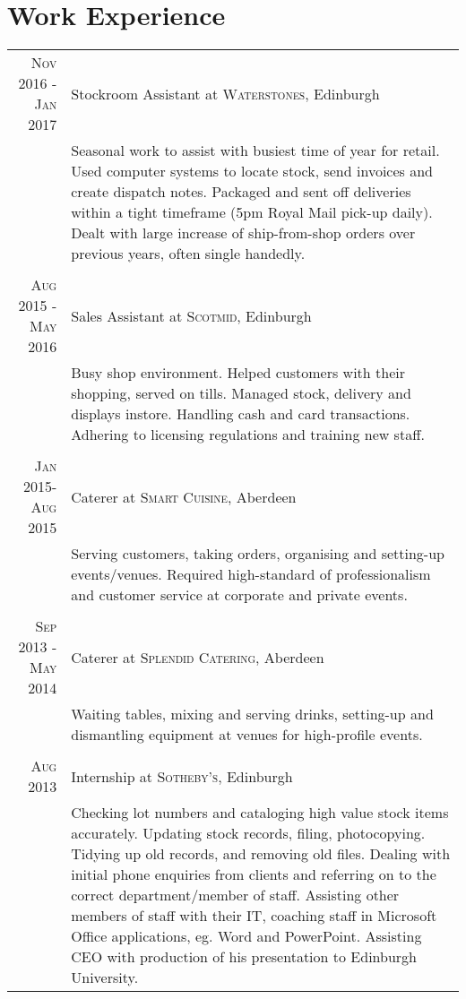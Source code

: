 \documentclass[12pt, a4paper]{article}
\begin{document}
\section{Work Experience}
\setlength\tabcolsep{4pt}\centering
\begin{tabular}{r|p{11cm}}

\textsc{Nov 2016 - Jan 2017} & Stockroom Assistant at \textsc{Waterstones}, Edinburgh \\
& \small{Seasonal work to assist with busiest time of year for retail. Used computer systems to locate stock, send invoices and create dispatch notes. Packaged and sent off deliveries within a tight timeframe (5pm Royal Mail pick-up daily). Dealt with large increase of ship-from-shop orders over previous years, often single handedly.} \\
\multicolumn{2}{c}{} \\

\textsc{Aug 2015 - May 2016} & Sales Assistant at \textsc{Scotmid}, Edinburgh \\
& \small{Busy shop environment. Helped customers with their shopping, served on tills. Managed stock, delivery and displays instore. Handling cash and card transactions. Adhering to licensing regulations and training new staff.} \\
\multicolumn{2}{c}{} \\

\textsc{Jan 2015-Aug 2015} & Caterer at \textsc{Smart Cuisine}, Aberdeen \emph{}\\
& \small{Serving customers, taking orders, organising and setting-up events/venues. Required high-standard of professionalism and customer service at corporate and private events.}\\
\multicolumn{2}{c}{} \\

\textsc{Sep 2013 - May 2014} & Caterer at \textsc{Splendid Catering}, Aberdeen \emph{}\\
& \small{Waiting tables, mixing and serving drinks, setting-up and dismantling equipment at venues for high-profile events.}\\
\multicolumn{2}{c}{} \\

\textsc{Aug 2013} & Internship at \textsc{Sotheby's}, Edinburgh \emph{}\\
& \small{Checking lot numbers and cataloging high value stock items accurately. Updating stock records, filing, photocopying. Tidying up old records, and removing old files. Dealing with initial phone enquiries from clients and referring on to the correct department/member of staff. Assisting other members of staff with their IT, coaching staff in Microsoft Office applications, eg. Word and PowerPoint. Assisting CEO with production of his presentation to Edinburgh University.}
\end{tabular}
\end{document}
